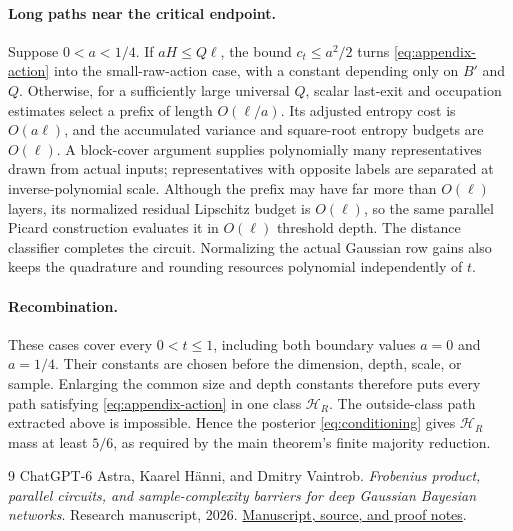 \documentclass[11pt]{article}
\theoremstyle{remark}\newtheorem{remark}[theorem]{Remark}
\begin{document}
\paragraph{Long paths near the critical endpoint.}
Suppose $0<a<1/4$. If $aH\le Q\ell$, the bound $c_t\le a^2/2$
turns \eqref{eq:appendix-action} into the small-raw-action case, with a
constant depending only on $B'$ and $Q$.
Otherwise, for a sufficiently large universal $Q$, scalar last-exit and
occupation estimates select a prefix of length $O(\ell/a)$. Its adjusted
entropy cost is $O(a\ell)$, and the accumulated variance and square-root
entropy budgets are $O(\ell)$. A block-cover argument supplies
polynomially many representatives drawn from actual inputs; representatives
with opposite labels are separated at inverse-polynomial scale.
Although the prefix may
have far more than $O(\ell)$ layers, its normalized residual Lipschitz
budget is $O(\ell)$, so the same parallel Picard construction evaluates
it in $O(\ell)$ threshold depth. The distance classifier completes the
circuit. Normalizing the actual Gaussian row gains also keeps the
quadrature and rounding resources polynomial independently of $t$.

\paragraph{Recombination.}
These cases cover every $0<t\le1$, including both boundary values
$a=0$ and $a=1/4$. Their constants are chosen before the dimension,
depth, scale, or sample. Enlarging the common size and depth constants
therefore puts every path satisfying \eqref{eq:appendix-action} in one
class $\mathcal H_R$. The outside-class path extracted above is
impossible. Hence the posterior \eqref{eq:conditioning} gives $\mathcal H_R$ mass at
least $5/6$, as required by the main theorem's finite majority reduction.


\begin{thebibliography}{9}
ChatGPT-6 Astra, Kaarel H\"anni, and Dmitry Vaintrob.
\emph{Frobenius product, parallel circuits, and sample-complexity barriers
for deep Gaussian Bayesian networks}. Research manuscript, 2026.
\href{https://github.com/kaarelh/AI-works/tree/main/neural-network-generalization/works-in-progress/boolean-depth-barriers}{Manuscript, source, and proof notes}.
\end{thebibliography}
\end{document}
